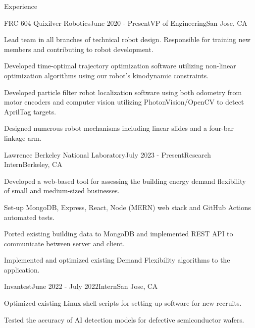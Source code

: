 \documentclass[
	11pt, %
]{tex/resume} %
\begin{document}
\begin{rSection}{Experience}

	\begin{rSubsection}{FRC 604 Quixilver Robotics}{June 2020 - Present}{VP of Engineering}{San Jose, CA}
		\item Lead team in all branches of technical robot design. Responsible for training new members and contributing to robot development.
        \item Developed time-optimal trajectory optimization software utilizing non-linear optimization algorithms using our robot’s kinodynamic constraints.
        \item Developed particle filter robot localization software using both odometry from motor encoders and computer vision utilizing PhotonVision/OpenCV to detect AprilTag targets.
        \item Designed numerous robot mechanisms including linear slides and a four-bar linkage arm.
        
	\end{rSubsection}


	\begin{rSubsection}{Lawrence Berkeley National Laboratory}{July 2023 - Present}{Research Intern}{Berkeley, CA}
		\item Developed a web-based tool for assessing the building energy demand flexibility of small and medium-sized businesses.
		\item Set-up MongoDB, Express, React, Node (MERN) web stack and GitHub Actions automated tests.
        \item Ported existing building data to MongoDB and implemented REST API to communicate between server and client.
        \item Implemented and optimized existing Demand Flexibility algorithms to the application.
        
	\end{rSubsection}


	\begin{rSubsection}{Invantest}{June 2022 - July 2022}{Intern}{San Jose, CA}
		\item Optimized existing Linux shell scripts for setting up software for new recruits.
		\item Tested the accuracy of AI detection models for defective semiconductor wafers.
	\end{rSubsection}


\end{rSection}
\end{document}
